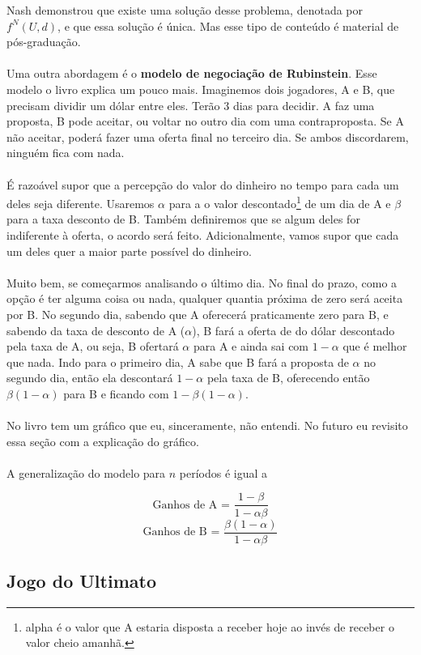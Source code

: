 \documentclass[a4paper,11pt,oneside]{book}
\theoremstyle{definition}
\theoremstyle{break}
\begin{document}
Nash demonstrou que existe uma solução desse problema, denotada por $f^N(U,d)$, e que essa solução é única. Mas esse tipo de conteúdo é material de pós-graduação.
\\~\\
Uma outra abordagem é o \textbf{modelo de negociação de Rubinstein}. Esse modelo o livro explica um pouco mais. Imaginemos dois jogadores, A e B, que precisam dividir um dólar entre eles. Terão 3 dias para decidir. A faz uma proposta, B pode aceitar, ou voltar no outro dia com uma contraproposta. Se A não aceitar, poderá fazer uma oferta final no terceiro dia. Se ambos discordarem, ninguém fica com nada.
\\~\\
É razoável supor que a percepção do valor do dinheiro no tempo para cada um deles seja diferente. Usaremos $\alpha$ para a o valor descontado\footnote{alpha é o valor que A estaria disposta a receber hoje ao invés de receber o valor cheio amanhã.} de um dia de A e $\beta$ para a taxa desconto de B. Também definiremos que se algum deles for indiferente à oferta, o acordo será feito. Adicionalmente, vamos supor que cada um deles quer a maior parte possível do dinheiro.
\\~\\
Muito bem, se começarmos analisando o último dia. No final do prazo, como a opção é ter alguma coisa ou nada, qualquer quantia próxima de zero será aceita por B. No segundo dia, sabendo que A oferecerá praticamente zero para B, e sabendo da taxa de desconto de A ($\alpha$), B fará a oferta de do dólar descontado pela taxa de A, ou seja, B ofertará $\alpha$ para A e ainda sai com $1 - \alpha$ que é melhor que nada. Indo para o primeiro dia, A sabe que B fará a proposta de $\alpha$ no segundo dia, então ela descontará $1-\alpha$ pela taxa de B, oferecendo então $\beta(1-\alpha)$ para B e ficando com $1 - \beta(1-\alpha)$.
\\~\\
No livro tem um gráfico que eu, sinceramente, não entendi. No futuro eu revisito essa seção com a explicação do gráfico.
\\~\\
A generalização do modelo para $n$ períodos é igual a

$$\textrm{Ganhos de A = } \frac{1-\beta}{1-\alpha\beta}$$
$$\textrm{Ganhos de B = } \frac{\beta(1 - \alpha)}{1-\alpha\beta}$$

\subsection{Jogo do Ultimato}
\end{document}
